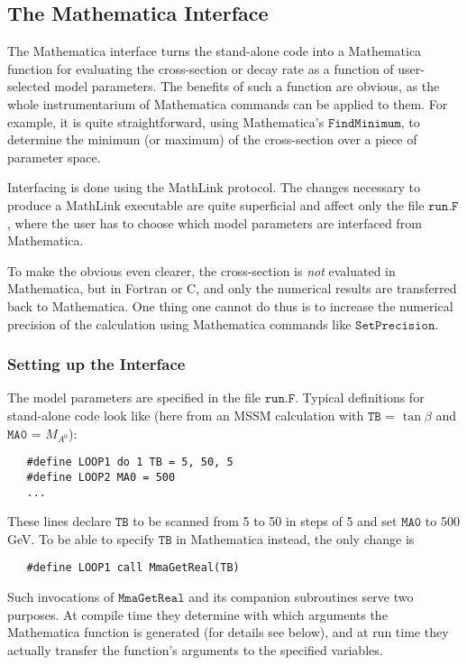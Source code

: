 \documentclass[twoside,11pt]{article}
\def\Code#1{\ensuremath{\texttt{#1}}}
\begin{document}
\subsection{The Mathematica Interface}

The Mathematica interface turns the stand-alone code into a Mathematica 
function for evaluating the cross-section or decay rate as a function of 
user-selected model parameters.  The benefits of such a function are 
obvious, as the whole instrumentarium of Mathematica commands can be 
applied to them.  For example, it is quite straightforward, using 
Mathematica's \Code{FindMinimum}, to determine the minimum (or maximum) 
of the cross-section over a piece of parameter space.

Interfacing is done using the MathLink protocol.  The changes necessary
to produce a MathLink executable are quite superficial and affect only
the file \Code{run.F}, where the user has to choose which model
parameters are interfaced from Mathematica.

To make the obvious even clearer, the cross-section is \emph{not} 
evaluated in Mathematica, but in Fortran or C, and only the numerical 
results are transferred back to Mathematica.  One thing one cannot do 
thus is to increase the numerical precision of the calculation using 
Mathematica commands like \Code{SetPrecision}.


\subsubsection{Setting up the Interface}

The model parameters are specified in the file \Code{run.F}.  Typical
definitions for stand-alone code look like (here from an MSSM 
calculation with \Code{TB} = $\tan\beta$ and \Code{MA0} = $M_{A^0}$):
\begin{verbatim}
   #define LOOP1 do 1 TB = 5, 50, 5
   #define LOOP2 MA0 = 500
   ...
\end{verbatim}
These lines declare \Code{TB} to be scanned from 5 to 50 in steps of 5 
and set \Code{MA0} to 500 GeV.  To be able to specify \Code{TB} in 
Mathematica instead, the only change is
\begin{verbatim}
   #define LOOP1 call MmaGetReal(TB)
\end{verbatim}
Such invocations of \Code{MmaGetReal} and its companion subroutines 
serve two purposes.  At compile time they determine with which arguments 
the Mathematica function is generated (for details see below), and at 
run time they actually transfer the function's arguments to the 
specified variables.
\end{document}
